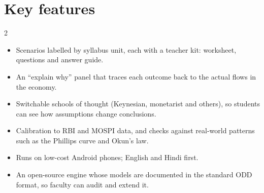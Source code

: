 \documentclass[10pt,a4paper]{article}
\begin{document}
\section{Key features}
\begin{multicols}{2}
\begin{itemize}
  \item Scenarios labelled by syllabus unit, each with a teacher kit: worksheet, questions and answer guide.
  \item An ``explain why'' panel that traces each outcome back to the actual flows in the economy.
  \item Switchable schools of thought (Keynesian, monetarist and others), so students can see how assumptions change conclusions.
  \item Calibration to RBI and MOSPI data, and checks against real-world patterns such as the Phillips curve and Okun's law.
  \item Runs on low-cost Android phones; English and Hindi first.
  \item An open-source engine whose models are documented in the standard ODD format, so faculty can audit and extend it.
\end{itemize}
\end{multicols}
\end{document}
